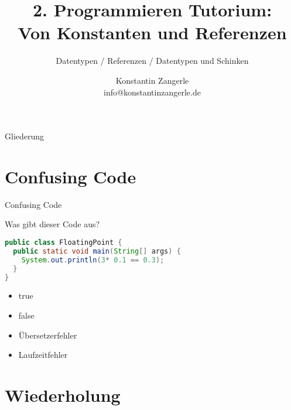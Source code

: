 \documentclass[18pt]{beamer}
\title[Programmieren Tutorium]{2. Programmieren Tutorium:\\ Von Konstanten und Referenzen}
\subtitle{Datentypen / Referenzen / Datentypen und Schinken}
\author{Konstantin Zangerle \\ info@konstantinzangerle.de}
\begin{document}

\begin{frame}
\titlepage
\end{frame}

\begin{frame}{Gliederung}
\tableofcontents
\end{frame}

\section{Confusing Code}
\begin{frame}[fragile]{Confusing Code}
\begin{exampleblock}{Was gibt dieser Code aus?}
\begin{lstlisting}[language=java]
public class FloatingPoint {
  public static void main(String[] args) {
    System.out.println(3* 0.1 == 0.3);
  }
}
\end{lstlisting}
\end{exampleblock}
\begin{itemize}
 \item true
 \item false
 \item Übersetzerfehler
 \item Laufzeitfehler
\end{itemize}
\end{frame}


\section{Wiederholung}
\end{document}
